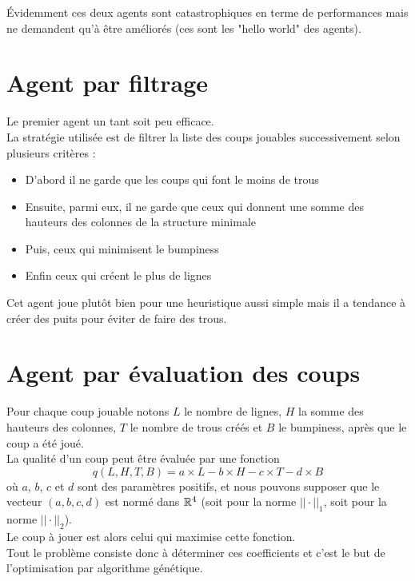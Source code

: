 Évidemment ces deux agents sont catastrophiques en terme de performances mais ne demandent qu'à être améliorés (ces sont les "hello world" des agents).

\section{Agent par filtrage}
Le premier agent un tant soit peu efficace.\\
La stratégie utilisée est de filtrer la liste des coups jouables successivement selon plusieurs critères :
\begin{itemize}
	\item D'abord il ne garde que les coups qui font le moins de trous
	\item Ensuite, parmi eux, il ne garde que ceux qui donnent une somme des hauteurs des colonnes de la structure minimale
	\item Puis, ceux qui minimisent le bumpiness
	\item Enfin ceux qui créent le plus de lignes 
\end{itemize} 

Cet agent joue plutôt bien pour une heuristique aussi simple mais il a tendance à créer des puits pour éviter de faire des trous.

\section{Agent par évaluation des coups}
\label{evaluation_des_coups}
Pour chaque coup jouable notons $L$ le nombre de lignes, $H$ la somme des hauteurs des colonnes, $T$ le nombre de trous créés et $B$ le bumpiness, après que le coup a été joué.\\
La qualité d'un coup peut être évaluée par une fonction $$q(L,H,T,B)=a\times L - b\times H - c\times T - d\times B$$
où $a$, $b$, $c$ et $d$ sont des paramètres positifs, et nous pouvons supposer que le vecteur $(a,b,c,d)$ est normé dans $\mathbb{R}^4$ (soit pour la norme $||\cdot||_1$, soit pour la norme $||\cdot||_2$).\\

Le coup à jouer est alors celui qui maximise cette fonction.\\

Tout le problème consiste donc à déterminer ces coefficients et c'est le but de l'optimisation par algorithme génétique.

